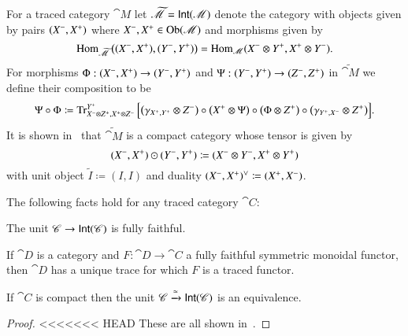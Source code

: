 \documentclass[12pt,oneside,article,draft]{memoir}
\begin{document}
\begin{enumerate}
For a traced category $\cat{M}$ let $\widetilde{\mathscr{M}}=\mathsf{Int}(\mathscr{M})$ denote the category with objects given by pairs $(X^-,X^+)$ where $X^-,X^+\in \operatorname{Ob}(\mathscr{M})$ and morphisms given by 
\[
	\operatorname{Hom}_{\widetilde{\mathscr{M}}}\big((X^-,X^+),(Y^-,Y^+)\big)=\operatorname{Hom}_{\mathscr{M}}(X^-\otimes Y^+,X^+\otimes Y^-).
\]
For morphisms $\Phi:(X^-,X^+)\to(Y^-,Y^+)$ and $\Psi:(Y^-,Y^+)\to(Z^-,Z^+)$ in $\widetilde{\cat{M}}$ we define their composition to be
\[
	\Psi\circ\Phi\coloneqq\operatorname{Tr}^{Y^+}_{X^-\otimes Z^+,X^+\otimes Z^-}\Big[\big(\gamma_{X^+,Y^+}\otimes Z^-\big)\circ\big(X^+\otimes\Psi\big)\circ\big(\Phi\otimes Z^+\big)\circ\big(\gamma_{Y^+,X^-}\otimes Z^+\big)\Big].
\]
It is shown in~\cite{JoyalStreetVerity} that $\widetilde{\cat{M}}$ is a compact category whose tensor is given by
\[
	(X^-,X^+)\odot(Y^-,Y^+)\coloneqq(X^-\otimes Y^-,X^+\otimes Y^+)
\]
with unit object $\tilde I\coloneqq(I,I)$ and duality $(X^-,X^+)^\vee\coloneqq(X^+,X^-)$.  


%
%
%

\begin{lemma}\label{lemma:fully faithful and trace}
The following facts hold for any traced category $\cat{C}$:
\begin{compactitem}
	\item The unit $\mathscr{C}\to\mathsf{Int}(\mathscr{C})$ is fully faithful.
	\item If $\cat{D}$ is a category and $F\colon\cat{D}\to\cat{C}$ a fully faithful symmetric monoidal functor, then $\cat{D}$ has a unique trace for which $F$ is a traced functor.
	\item If $\cat{C}$ is compact then the unit $\mathscr{C}\xrightarrow{\simeq}\mathsf{Int}(\mathscr{C})$ is an equivalence.
\end{compactitem}
\end{lemma}
\begin{proof}
<<<<<<< HEAD
	These are all shown in~\cite{Joyal-Street-Verity}.
\end{proof}


\end{enumerate}
\end{document}
